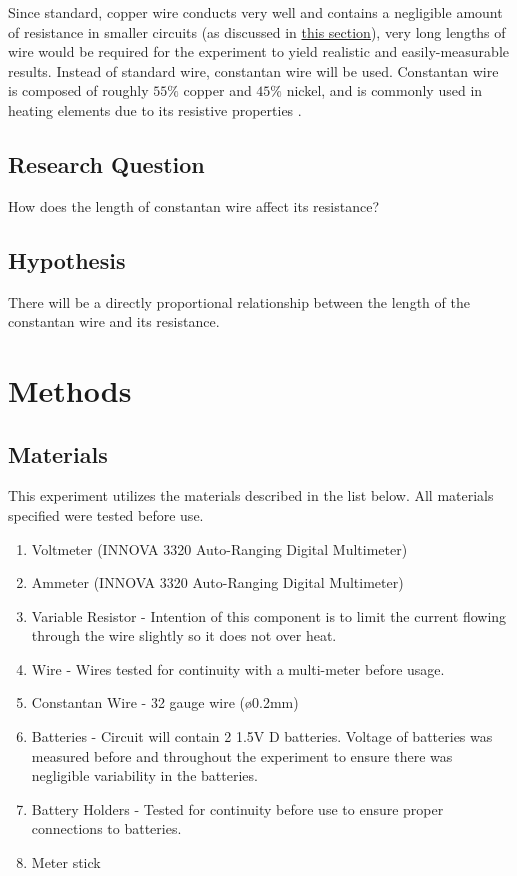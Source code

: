 \documentclass{article}
\begin{document}
Since standard, copper wire conducts very well and contains a negligible amount of resistance in smaller circuits (as discussed in \hyperref[sec:wires]{this section}), very long lengths of wire would be required for the experiment to yield realistic and easily-measurable results. Instead of standard wire, constantan wire will be used. Constantan wire is composed of roughly $55\%$ copper and $45\%$ nickel, and is commonly used in heating elements due to its resistive properties \cite{sis}.

\subsection{Research Question}

How does the length of constantan wire affect its resistance?

\subsection{Hypothesis}
\label{sec:hypot}

There will be a directly proportional relationship between the length of the constantan wire and its resistance.

\section{Methods}

\subsection{Materials}
This experiment utilizes the materials described in the list below. All materials specified were tested before use.

\begin{enumerate}
    \item Voltmeter (INNOVA 3320 Auto-Ranging Digital Multimeter)
    \item Ammeter (INNOVA 3320 Auto-Ranging Digital Multimeter)
    \item Variable Resistor - Intention of this component is to limit the current flowing through the wire slightly so it does not over heat.
    \item Wire - Wires tested for continuity with a multi-meter before usage.
    \item Constantan Wire - 32 gauge wire (ø0.2mm)
    \item Batteries - Circuit will contain 2 1.5V D batteries. Voltage of batteries was measured before and throughout the experiment to ensure there was negligible variability in the batteries.
    \item Battery Holders - Tested for continuity before use to ensure proper connections to batteries.
    \item Meter stick
\end{enumerate}
\end{document}

